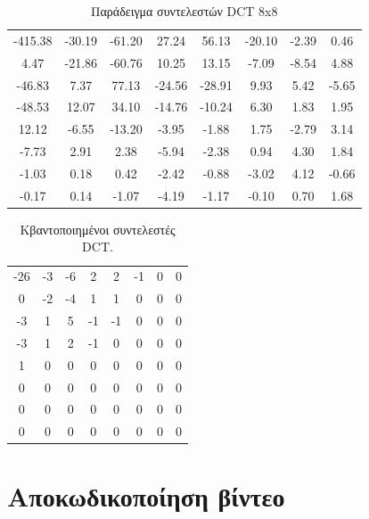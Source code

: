 \begin{table}[H]
    \begin{center}
        \begin{tabular}{| c  c  c  c  c  c  c  c |}
        \hline
        -415.38 & -30.19 & -61.20 & 27.24 & 56.13 & -20.10 & -2.39 & 0.46 \\
        4.47 & -21.86 & -60.76 & 10.25 & 13.15 & -7.09 & -8.54 & 4.88 \\
        -46.83 & 7.37 & 77.13 & -24.56 & -28.91 & 9.93 & 5.42 & -5.65 \\
        -48.53 & 12.07 & 34.10 & -14.76 & -10.24 & 6.30 & 1.83 & 1.95 \\
        12.12 & -6.55 & -13.20 & -3.95 & -1.88 & 1.75 & -2.79 & 3.14 \\
        -7.73 & 2.91 & 2.38 & -5.94 & -2.38 & 0.94 & 4.30 & 1.84 \\
        -1.03 & 0.18 & 0.42 & -2.42 & -0.88 & -3.02 & 4.12 & -0.66 \\
        -0.17 & 0.14 & -1.07 & -4.19 & -1.17 & -0.10 & 0.70 & 1.68 \\
        \hline
        \end{tabular}
    \end{center}
    \caption{Παράδειγμα συντελεστών DCT 8x8}
    \label{table:coeff}
\end{table}

\begin{table}[H]
    \begin{center}
        \begin{tabular}{| c  c  c  c  c  c  c  c |}
        \hline
        -26 & -3 & -6 & 2 & 2 & -1 & 0 & 0 \\
        0 & -2 & -4 & 1 & 1 & 0 & 0 & 0 \\
        -3 & 1 & 5 & -1 & -1 & 0 & 0 & 0 \\
        -3 & 1 & 2 & -1 & 0 & 0 & 0 & 0 \\
         1 & 0 & 0 & 0 & 0 & 0 & 0 & 0 \\
        0 & 0 & 0 & 0 & 0 & 0 & 0 & 0 \\
        0 & 0 & 0 & 0 & 0 & 0 & 0 & 0 \\
        0 & 0 & 0 & 0 & 0 & 0 & 0 & 0 \\
        \hline
        \end{tabular}
    \end{center}
    \caption{Κβαντοποιημένοι συντελεστές DCT.}
    \label{table:results}
\end{table}

\section{Αποκωδικοποίηση βίντεο}
\label{section:sect26}

